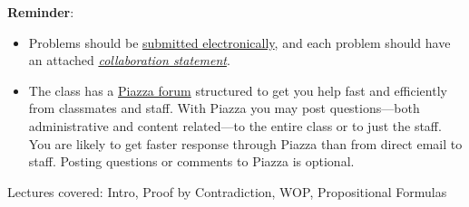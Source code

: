 \documentclass[handout]{mcs}
\begin{document}
\renewcommand{\reading}{ Part~\bref{part:proofs}{. \emph{Proofs:
      Introduction}}; Chapter~\bref{proofs_chap}{.\ \emph{What is a
      Proof?}}; Chapter~\bref{well_ordering_chap}{.\ \emph{The Well
      Ordering Principle}}; and Chapter~\bref{logicform_chap}{ through
    \bref{SAT_sec}{, covering \emph{Propositional Logic}}}.  These
  assigned readings do \textbf{not} include the Problem sections.
  (Many of the problems in the text will appear as class or homework
  problems.)}


\medskip

\textbf{Reminder}:

\begin{itemize}

\item Problems should be 
  \href{http://courses.csail.mit.edu/6.042/fall13/submission.shtml}
       {submitted electronically}, and each problem should have an attached
  \href{http://courses.csail.mit.edu/6.042/fall13/submission.shtml#collab-state}
       {\emph{collaboration statement}}.

\item The class has a
  \href{http://piazza.com/mit/fall2013/6042j18062j/home}{Piazza
    forum} structured to get you help fast and efficiently from
  classmates and staff.  With Piazza you may post questions---both
  administrative and content related---to the entire class or to just
  the staff.  You are likely to get faster response through Piazza
  than from direct email to staff.  Posting questions or comments to
  Piazza is optional.
\end{itemize}

\begin{staffnotes}
Lectures covered: Intro, Proof by Contradiction, WOP, Propositional Formulas
\end{staffnotes}








\end{document}
